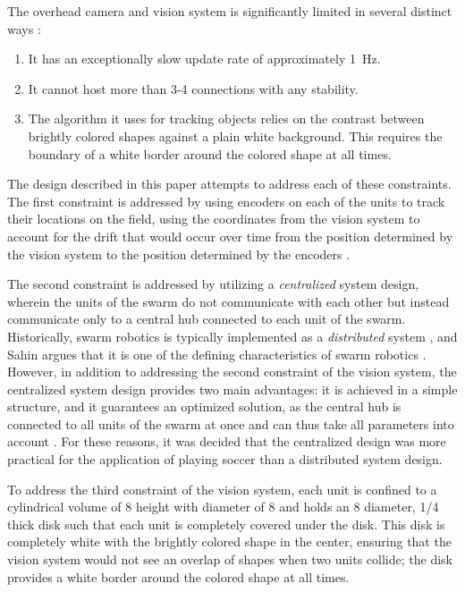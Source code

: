 \documentclass{article}
\begin{document}
     \par The overhead camera and vision system is significantly limited in several distinct ways \cite{ProjectDescription}:
     \begin{enumerate}
          \item It has an exceptionally slow update rate of approximately \SI{1}{\hertz}.
          \item It cannot host more than 3-4 connections with any stability.
          \item The algorithm it uses for tracking objects relies on the contrast between brightly colored shapes against a plain white background. This requires the boundary of a white border around the colored shape at all times.
     \end{enumerate}
     \par The design described in this paper attempts to address each of these constraints. The first constraint is addressed by using encoders on each of the units to track their locations on the field, using the coordinates from the vision system to account for the drift that would occur over time from the position determined by the vision system to the position determined by the encoders \cite{REP105}.
     \par The second constraint is addressed by utilizing a \textit{centralized} system design, wherein the units of the swarm do not communicate with each other but instead communicate only to a central hub connected to each unit of the swarm.
     Historically, swarm robotics is typically implemented as a \textit{distributed} system \cite{Dimos08}\cite{Easton04}, and Sahin argues that it is one of the defining characteristics of swarm robotics \cite{Sahin08}. However, in addition to addressing the second constraint of the vision system, the centralized system design provides two main advantages: it is achieved in a simple structure, and it guarantees an optimized solution, as the central hub is connected to all units of the swarm at once and can thus take all parameters into account \cite{Barca16}. For these reasons, it was decided that the centralized design was more practical for the application of playing soccer than a distributed system design.
     \par To address the third constraint of the vision system, each unit is confined to a cylindrical volume of \SI{8}{\in} height with diameter of \SI{8}{\in} and holds an \SI{8}{\in} diameter, \SI{1/4}{\in} thick disk such that each unit is completely covered under the disk. This disk is completely white with the brightly colored shape in the center, ensuring that the vision system would not see an overlap of shapes when two units collide; the disk provides a white border around the colored shape at all times.
\end{document}
